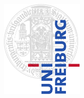 \documentclass[12pt,twoside,a4paper,final]{report}
\begin{document}
\newcommand{\mgl}{mg l$^{-1}$}
\newcommand{\mmoll}{mmol l$^{-1}$}
\newcommand{\meql}{meq l$^{-1}$}
\newcommand{\muscm}{$\mu$S cm$^{-1}$}
\newcommand{\water}{H$_2$O}
\newcommand{\kion}{K$^+$}
\newcommand{\naion}{Na$^+$}
\newcommand{\caion}{Ca$^{2+}$}
\newcommand{\mgion}{Mg$^{2+}$}
\newcommand{\clion}{Cl$^-$}
\newcommand{\nitrate}{NO$_3^-$}
\newcommand{\nitrite}{NO$_2^-$}
\newcommand{\nhion}{NH$_4^+$}
\newcommand{\hcoion}{HCO$_3^-$}
\newcommand{\hardness}{Ca$^{2+}$ + Mg$^{2+}$}


\pagestyle{empty}

\begin{figure}[h]
  \begin{flushright}
    \vspace{-2cm}
    \includegraphics[width=4cm]{images/ufcd-logo-e1-a4-color} %
  \end{flushright}
\end{figure}
\end{document}
